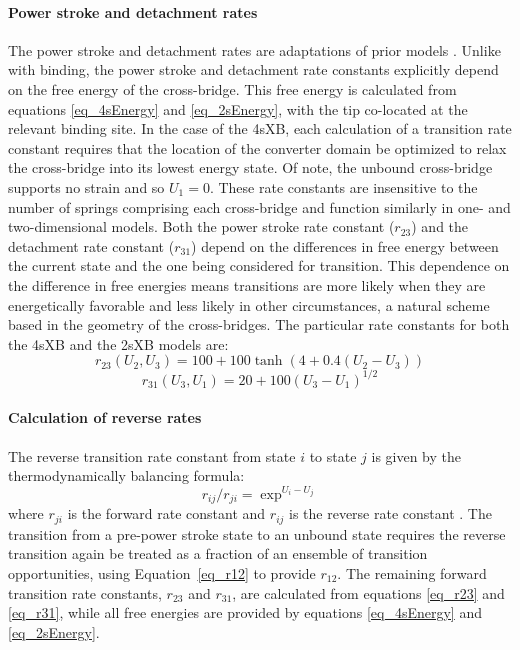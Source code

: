 \documentclass[10pt]{article}
\newcommand{\citep}[1]{\cite{#1}} %
\begin{document}
\paragraph{Power stroke and detachment rates} %
The power stroke and detachment rates are adaptations of prior models \citep{Pate1989, Tanner2007}.
Unlike with binding, the power stroke and detachment rate constants explicitly depend on the free energy of the cross-bridge. 
This free energy is calculated from equations \ref{eq_4sEnergy} and \ref{eq_2sEnergy}, with the tip co-located at the relevant binding site. 
In the case of the 4sXB, each calculation of a transition rate constant requires that the location of the converter domain be optimized to relax the cross-bridge into its lowest energy state.
Of note, the unbound cross-bridge supports no strain and so $U_1 = 0$.
These rate constants are insensitive to the number of springs comprising each cross-bridge and function similarly in one- and two-dimensional models. 
Both the power stroke rate constant ($r_{23}$) and the detachment rate constant ($r_{31}$) depend on the differences in free energy between the current state and the one being considered for transition.  
This dependence on the difference in free energies means transitions are more likely when they are energetically favorable and less likely in other circumstances, a natural scheme based in the geometry of the cross-bridges.
The particular rate constants for both the 4sXB and the 2sXB models are: 
\begin{equation}
    r_{23}(U_2, U_3) = 100 + 100\tanh(4 + 0.4 (U_2 - U_3)) 
    \label{eq_r23}
\end{equation}
\begin{equation}
    r_{31}(U_3, U_1) = 20 + 100 (U_3 - U_1)^{1/2}
    \label{eq_r31}
\end{equation}

\paragraph{Calculation of reverse rates} %
The reverse transition rate constant from state $i$ to state $j$ is given by the thermodynamically balancing formula: 
\begin{equation}
    r_{ij}/r_{ji}=\exp^{U_i-U_j}
    \label{eq_reverse}
\end{equation}
where $r_{ji}$ is the forward rate constant and $r_{ij}$ is the reverse rate constant \citep{Pate1989, Daniel1998, Tanner2007}.
The transition from a pre-power stroke state to an unbound state requires the reverse transition again be treated as a fraction of an ensemble of transition opportunities, using Equation~\ref{eq_r12} to provide $r_{12}$. 
The remaining forward transition rate constants, $r_{23}$ and $r_{31}$, are calculated from equations \ref{eq_r23} and \ref{eq_r31}, while all free energies are provided by equations \ref{eq_4sEnergy} and \ref{eq_2sEnergy}.
\end{document}
